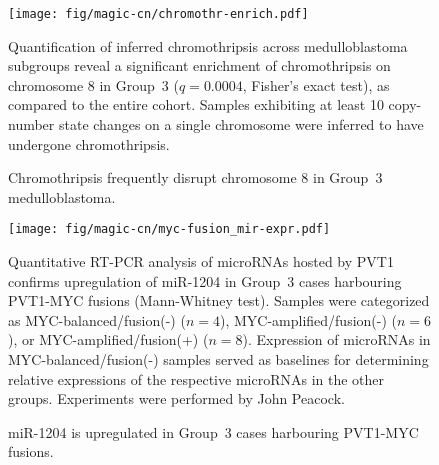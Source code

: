 \documentclass[11pt,letterpaper]{article}
\theoremstyle{definition}
\begin{document}
\begin{figure}[h]
	\begin{center}
		\texttt{[image: fig/magic-cn/chromothr-enrich.pdf]}
	\end{center}
	\caption{Chromothripsis frequently disrupt chromosome 8 in Group~3 medulloblastoma.}
	Quantification of inferred chromothripsis across medulloblastoma subgroups reveal a significant enrichment of chromothripsis on chromosome 8 in Group~3 ($q = 0.0004$, Fisher's exact test), as compared to the entire cohort. Samples exhibiting at least 10 copy-number state changes on a single chromosome were inferred to have undergone chromothripsis.
	\label{fig:chromothr-enrich}
\end{figure}

\begin{figure}[h]
	\begin{center}
		\texttt{[image: fig/magic-cn/myc-fusion\_mir-expr.pdf]}
	\end{center}
	\caption{miR-1204 is upregulated in Group~3 cases harbouring PVT1-MYC fusions.}
	Quantitative RT-PCR analysis of microRNAs hosted by PVT1 confirms upregulation of miR-1204 in Group~3 cases harbouring PVT1-MYC fusions (Mann-Whitney test). Samples were categorized as MYC-balanced/fusion(-) ($n = 4$), MYC-amplified/fusion(-) ($n = 6$), or MYC-amplified/fusion(+) ($n = 8$). Expression of microRNAs in MYC-balanced/fusion(-) samples served as baselines for determining relative expressions of the respective microRNAs in the other groups. Experiments were performed by John Peacock.
	\label{fig:myc-fusion_mir-expr}
\end{figure}

\clearpage

\section{}

\begin{multicols}{2}
\small
{}
\end{multicols}
\end{document}
